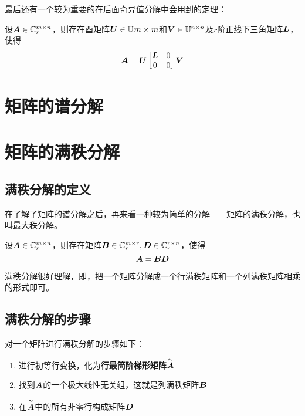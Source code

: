 \documentclass[12pt, a4paper, oneside, UTF8]{ctexbook}
\begin{document}
最后还有一个较为重要的在后面奇异值分解中会用到的定理：
\begin{them}{}{}
    设$\boldsymbol{A}\in\mathbb{C}^{m\times n}_r$，则存在酉矩阵$\boldsymbol{U}\in\mathbb{U}^{}m\times m$和$\boldsymbol{V}\in\mathbb{U}^{n\times n}$及$r$阶正线下三角矩阵$\boldsymbol{L}$，使得\[\boldsymbol{A}=\boldsymbol{U}\begin{bmatrix}
        \boldsymbol{L}&0\\0&0
    \end{bmatrix}\boldsymbol{V}\]
\end{them}

\section{矩阵的谱分解}

\section{矩阵的满秩分解}
\subsection{满秩分解的定义}
在了解了矩阵的谱分解之后，再来看一种较为简单的分解——矩阵的满秩分解，也叫最大秩分解。
\begin{them}{}{}
    设$\boldsymbol{A}\in\mathbb{C}_r^{m\times n}$，则存在矩阵$\boldsymbol{B}\in\mathbb{C}_r^{m\times r}, \boldsymbol{D}\in\mathbb{C}_r^{r\times n}$，使得\[\boldsymbol{A}=\boldsymbol{B}\boldsymbol{D}\]
\end{them}

满秩分解很好理解，即，把一个矩阵分解成一个行满秩矩阵和一个列满秩矩阵相乘的形式即可。
\subsection{满秩分解的步骤}
对一个矩阵进行满秩分解的步骤如下：
\begin{enumerate}[leftmargin=4em]
    \item 进行初等行变换，化为\textbf{行最简阶梯形矩阵}$\overset{\sim}{\boldsymbol{A}}$
    \item 找到$\boldsymbol{A}$的一个极大线性无关组，这就是列满秩矩阵$\boldsymbol{B}$
    \item 在$\overset{\sim}{\boldsymbol{A}}$中的所有非零行构成矩阵$\boldsymbol{D}$
\end{enumerate}
\ifx\allfiles\undefined
\end{document}

